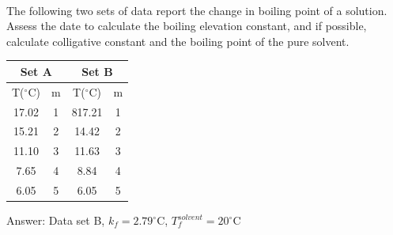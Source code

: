 \documentclass[main.tex]{subfiles}
\begin{document}
\begin{description}
\begin{example}
\begin{tikzpicture}
\end{tikzpicture}
\faDiamond\ \\
The following two sets of data report the change in boiling point of a solution. Assess the date to calculate the boiling elevation constant, and if possible, calculate colligative constant and the boiling point of the pure solvent. 
\begin{center}\begin{tabular}[t]{  c c c c   }
\toprule
\multicolumn{2}{c}{Set A}&\multicolumn{2}{c}{Set B}\\
\toprule
  T($^{\circ}$C)	&m&T($^{\circ}$C)	&m\\
\midrule
 17.02	&1&	817.21	&1\\
 15.21	&2&	14.42	&2\\
  11.10	&3&	11.63	&3\\
 7.65	&4&	8.84	&4\\
 6.05	&5&	6.05		&5\\
\bottomrule
\end{tabular}\end{center}
%
\begin{flushright} Answer: Data set B, $k_f=2.79^{\circ}$C, $T^{solvent}_f=20^{\circ}$C\end{flushright}
\end{example}%



\end{description}
\end{document}
